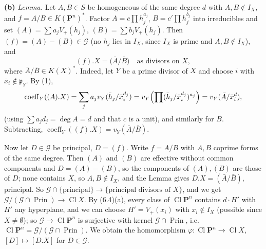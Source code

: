 \documentclass[11pt]{article}
\begin{document}
\textbf{(b)} \emph{Lemma.} Let $A,B\in S$ be homogeneous of the same degree $d$ with $A,B\notin I_X$, and $f=A/B\in K(\mathbf P^n)^*$. Factor $A=c\prod h_j^{a_j}$, $B=c'\prod h_j^{b_j}$ into irreducibles and set $(A)=\sum a_jV_+(h_j)$, $(B)=\sum b_jV_+(h_j)$. Then $(f)=(A)-(B)\in\mathcal G$ (no $h_j$ lies in $I_X$, since $I_X$ is prime and $A,B\notin I_X$), and
\[
(f).X=\bigl(\bar A/\bar B\bigr)\quad\text{as divisors on }X,
\]
where $\bar A/\bar B\in K(X)^*$. Indeed, let $Y$ be a prime divisor of $X$ and choose $i$ with $\bar x_i\notin\mathfrak p_Y$. By (1),
\[
\operatorname{coeff}_Y((A).X)=\sum_ja_jv_Y(\bar h_j/\bar x_i^{d_j})=v_Y\Bigl(\prod(\bar h_j/\bar x_i^{d_j})^{a_j}\Bigr)=v_Y(\bar A/\bar x_i^d),
\]
(using $\sum a_jd_j=\deg A=d$ and that $c$ is a unit), and similarly for $B$. Subtracting, $\operatorname{coeff}_Y((f).X)=v_Y(\bar A/\bar B)$.

Now let $D\in\mathcal G$ be principal, $D=(f)$. Write $f=A/B$ with $A,B$ coprime forms of the same degree. Then $(A)$ and $(B)$ are effective without common components and $D=(A)-(B)$, so the components of $(A),(B)$ are those of $D$; none contains $X$, so $A,B\notin I_X$, and the Lemma gives $D.X=(\bar A/\bar B)$, principal. So $\mathcal G\cap\{\text{principal}\}\to\{\text{principal divisors of }X\}$, and we get $\mathcal G/(\mathcal G\cap\operatorname{Prin})\to\operatorname{Cl}X$. By (6.4)(a), every class of $\operatorname{Cl}\mathbf P^n$ contains $d\cdot H'$ with $H'$ any hyperplane, and we can choose $H'=V_+(x_i)$ with $x_i\notin I_X$ (possible since $X\ne\emptyset$); so $\mathcal G\to\operatorname{Cl}\mathbf P^n$ is surjective with kernel $\mathcal G\cap\operatorname{Prin}$, i.e.\ $\operatorname{Cl}\mathbf P^n=\mathcal G/(\mathcal G\cap\operatorname{Prin})$. We obtain the homomorphism $\varphi:\operatorname{Cl}\mathbf P^n\to\operatorname{Cl}X$, $[D]\mapsto[D.X]$ for $D\in\mathcal G$.
\end{document}
